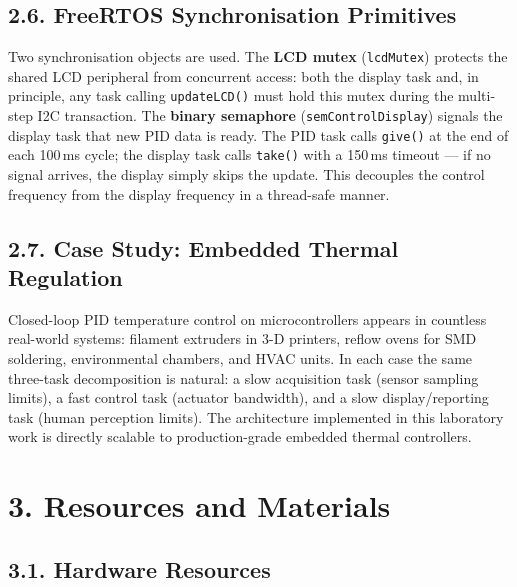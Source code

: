 \documentclass[12pt]{article}
\begin{document}
\subsection*{2.6. FreeRTOS Synchronisation Primitives}

Two synchronisation objects are used. The \textbf{LCD mutex} (\texttt{lcdMutex}) protects the shared
LCD peripheral from concurrent access: both the display task and, in principle, any task calling
\texttt{updateLCD()} must hold this mutex during the multi-step I2C transaction. The \textbf{binary
semaphore} (\texttt{semControlDisplay}) signals the display task that new PID data is ready. The PID
task calls \texttt{give()} at the end of each 100\,ms cycle; the display task calls \texttt{take()}
with a 150\,ms timeout --- if no signal arrives, the display simply skips the update. This decouples
the control frequency from the display frequency in a thread-safe manner.

\subsection*{2.7. Case Study: Embedded Thermal Regulation}

Closed-loop PID temperature control on microcontrollers appears in countless real-world systems:
filament extruders in 3-D printers, reflow ovens for SMD soldering, environmental chambers, and HVAC
units. In each case the same three-task decomposition is natural: a slow acquisition task (sensor
sampling limits), a fast control task (actuator bandwidth), and a slow display/reporting task (human
perception limits). The architecture implemented in this laboratory work is directly scalable to
production-grade embedded thermal controllers.

\section*{3. Resources and Materials}

\subsection*{3.1. Hardware Resources}
\end{document}
